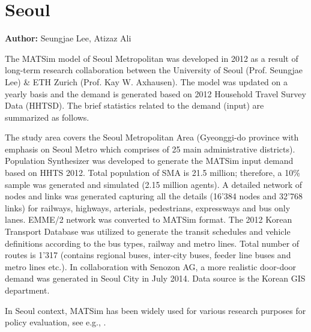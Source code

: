 \section{Seoul}
\label{ch:seoul}
\hfill \textbf{Author:} Seungjae Lee, Atizaz Ali

The MATSim model of Seoul Metropolitan was developed in 2012 as a result of long-term research collaboration between the University of Seoul (Prof. Seungjae Lee) \& ETH Zurich (Prof. Kay W. Axhausen). The model was updated on a yearly basis and the demand is generated based on 2012 Household Travel Survey Data (HHTSD). The brief statistics related to the demand (input) are summarized as follows. 

The study area covers the Seoul Metropolitan Area (Gyeonggi-do province with emphasis on Seoul Metro which comprises of 25 main administrative districts). Population Synthesizer was developed to generate the MATSim input demand based on HHTS 2012. Total population of SMA is 21.5 million; therefore, a 10\% sample was generated and simulated (2.15 million agents). A detailed network of nodes and links was generated capturing all the details (16'384 nodes and 32'768 links) for railways, highways, arterials, pedestrians, expressways and bus only lanes. EMME/2 network was converted to MATSim format. The 2012 Korean Transport Database was utilized to generate the transit schedules and vehicle definitions according to the bus types, railway and metro lines. Total number of routes is 1'317 (contains regional buses, inter-city buses, feeder line buses and metro lines etc.). In collaboration with Senozon AG, a more realistic door-door demand was generated in Seoul City in July 2014. Data source is the Korean GIS department.

In Seoul context, MATSim has been widely used for various research purposes for policy evaluation, see e.g., \citet[][]{KimEtAl_IJHE_2012, LeeAli_unpub_IWUTSCD_2014}.

